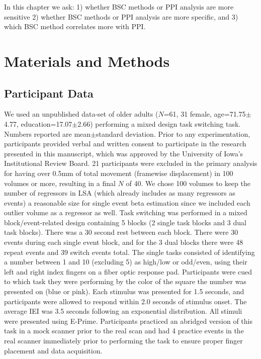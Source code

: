 \documentclass[phd,appendix,figures]{uithesis}
\begin{document}
In this chapter we ask:
1) whether BSC methods or PPI analysis are more sensitive
2) whether BSC methods or PPI analysis are more specific, and
3) which BSC method correlates more with PPI.

\section{Materials and Methods}

\subsection*{Participant Data}
\label{methods:task-switch2}

We used an unpublished data-set
of older adults ($N$=61, 31 female, age=71.75$\pm$4.77, education=17.07$\pm$2.66)
performing a mixed design task switching task.
Numbers reported are mean$\pm$standard deviation.
Prior to any experimentation, participants provided verbal and written consent
to participate in the research presented in this manuscript, which was approved
by the University of Iowa's Institutional Review Board.
21 participants were excluded in the primary analysis for having over
0.5mm of total movement (framewise displacement) in 100 volumes or more,
resulting in a final $N$ of 40.
We chose 100 volumes to keep the number of regressors in LSA
(which already includes as many regressors as events) a reasonable size
for single event beta estimation since we included each outlier volume
as a regressor as well.
Task switching was performed in a mixed block/event-related design containing
5 blocks (2 single task blocks and 3 dual task blocks).
There was a 30 second rest between each block.
There were 30 events during each single event block,
and for the 3 dual blocks there were 48 repeat events and 39 switch events total.
The single tasks consisted of identifying a number between
1 and 10 (excluding 5) as high/low or odd/even, using their left and right index fingers
on a fiber optic response pad.
Participants were cued to which task they were performing by the color of the square
the number was presented on (blue or pink).
Each stimulus was presented for 1.5 seconds, and participants were allowed
to respond within 2.0 seconds of stimulus onset.
The average IEI was 3.5 seconds following an exponential distribution.
All stimuli were presented using E-Prime.
Participants practiced an abridged version of this task in a mock scanner
prior to the real scan and had 4 practice events in the real scanner immediately
prior to performing the task to ensure proper finger placement and data acquisition.
\end{document}
